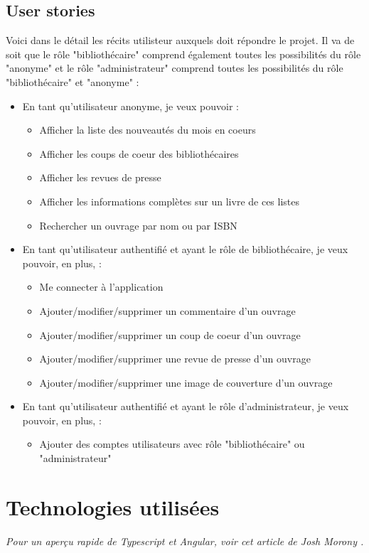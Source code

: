\documentclass[a4paper, 12pt]{article}
\begin{document}
\subsection{User stories}
Voici dans le détail les récits utilisteur auxquels doit répondre le projet. Il va de soit que le rôle "bibliothécaire"
comprend également toutes les possibilités du rôle "anonyme" et le rôle "administrateur" comprend toutes les possibilités
du rôle "bibliothécaire" et "anonyme" :
\begin{itemize}
    \item En tant qu'utilisateur anonyme, je veux pouvoir :
    \begin{itemize}
        \item Afficher la liste des nouveautés du mois en coeurs
        \item Afficher les coups de coeur des bibliothécaires
        \item Afficher les revues de presse
        \item Afficher les informations complètes sur un livre de ces listes
        \item Rechercher un ouvrage par nom ou par ISBN
    \end{itemize}
    \item En tant qu'utilisateur authentifié et ayant le rôle de bibliothécaire, je veux pouvoir, en plus, :
    \begin{itemize}
        \item Me connecter à l'application
        \item Ajouter/modifier/supprimer un commentaire d'un ouvrage
        \item Ajouter/modifier/supprimer un coup de coeur d'un ouvrage
        \item Ajouter/modifier/supprimer une revue de presse d'un ouvrage
        \item Ajouter/modifier/supprimer une image de couverture d'un ouvrage
    \end{itemize}
    \item En tant qu'utilisateur authentifié et ayant le rôle d'administrateur, je veux pouvoir, en plus, :
    \begin{itemize}
        \item Ajouter des comptes utilisateurs avec rôle "bibliothécaire" ou "administrateur"
    \end{itemize}
\end{itemize}

\section{Technologies utilisées}
\textit{Pour un aperçu rapide de Typescript et Angular, voir cet article de Josh Morony \cite{ref30}.}
\end{document}
